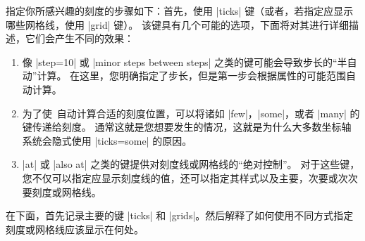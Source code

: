 
指定你所感兴趣的刻度的步骤如下：首先，使用 |ticks| 键（或者，若指定应显示哪些网格线，使用 |grid| 键）。 该键具有几个可能的选项，下面将对其进行详细描述，它们会产生不同的效果：
%
\begin{enumerate}
    \item 像 |step=10| 或 |minor steps between steps| 之类的键可能会导致步长的``半自动''计算。 在这里，您明确指定了步长，但是第一步会根据属性的可能范围自动计算。
    \item 为了使\tikzname\ 自动计算合适的刻度位置，可以将诸如 |few|，|some|，或者 |many| 的键传递给刻度。 通常这就是您想要发生的情况，这就是为什么大多数坐标轴系统会隐式使用 |ticks={some}| 的原因。
    \item |at| 或 |also at| 之类的键提供对刻度线或网格线的``绝对控制''。 对于这些键，您不仅可以指定应显示刻度线的值，还可以指定其样式以及主要，次要或次次要刻度或网格线。
\end{enumerate}


在下面，首先记录主要的键 |ticks| 和 |grids|。然后解释了如何使用不同方式指定刻度或网格线应该显示在何处。


